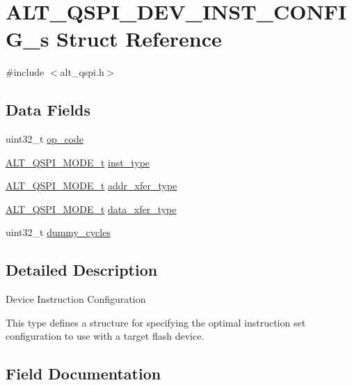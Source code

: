 \hypertarget{structALT__QSPI__DEV__INST__CONFIG__s}{}\section{A\+L\+T\+\_\+\+Q\+S\+P\+I\+\_\+\+D\+E\+V\+\_\+\+I\+N\+S\+T\+\_\+\+C\+O\+N\+F\+I\+G\+\_\+s Struct Reference}
\label{structALT__QSPI__DEV__INST__CONFIG__s}


{\ttfamily \#include $<$alt\+\_\+qspi.\+h$>$}

\subsection*{Data Fields}
\begin{DoxyCompactItemize}
\item 
uint32\+\_\+t \mbox{\hyperlink{structALT__QSPI__DEV__INST__CONFIG__s_add4e3c320b8d5256bce1eb87e794f8a8}{op\+\_\+code}}
\item 
\mbox{\hyperlink{group__ALT__QSPI__DEV__CFG_ga4d03e307842e1ed33be0039a56ef62c3}{A\+L\+T\+\_\+\+Q\+S\+P\+I\+\_\+\+M\+O\+D\+E\+\_\+t}} \mbox{\hyperlink{structALT__QSPI__DEV__INST__CONFIG__s_a168705d7df15506a68e330b6cfda75f1}{inst\+\_\+type}}
\item 
\mbox{\hyperlink{group__ALT__QSPI__DEV__CFG_ga4d03e307842e1ed33be0039a56ef62c3}{A\+L\+T\+\_\+\+Q\+S\+P\+I\+\_\+\+M\+O\+D\+E\+\_\+t}} \mbox{\hyperlink{structALT__QSPI__DEV__INST__CONFIG__s_acc509437022fb33695c4a7d72f7e5705}{addr\+\_\+xfer\+\_\+type}}
\item 
\mbox{\hyperlink{group__ALT__QSPI__DEV__CFG_ga4d03e307842e1ed33be0039a56ef62c3}{A\+L\+T\+\_\+\+Q\+S\+P\+I\+\_\+\+M\+O\+D\+E\+\_\+t}} \mbox{\hyperlink{structALT__QSPI__DEV__INST__CONFIG__s_a549bbd189a5e88e4a72bd2e714f37cb0}{data\+\_\+xfer\+\_\+type}}
\item 
uint32\+\_\+t \mbox{\hyperlink{structALT__QSPI__DEV__INST__CONFIG__s_aa0525f203a8a92818e9b681df4700b5f}{dummy\+\_\+cycles}}
\end{DoxyCompactItemize}


\subsection{Detailed Description}
Device Instruction Configuration

This type defines a structure for specifying the optimal instruction set configuration to use with a target flash device. 

\subsection{Field Documentation}
\mbox{\label{structALT__QSPI__DEV__INST__CONFIG__s_acc509437022fb33695c4a7d72f7e5705}} 
